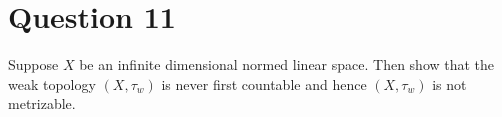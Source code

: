 \section{Question 11}
\horz

Suppose $X$ be an infinite dimensional normed linear space. Then show that the weak topology $(X,\tau_w)$ is never first countable and hence $(X,\tau_w)$ is not metrizable. 

\horz
